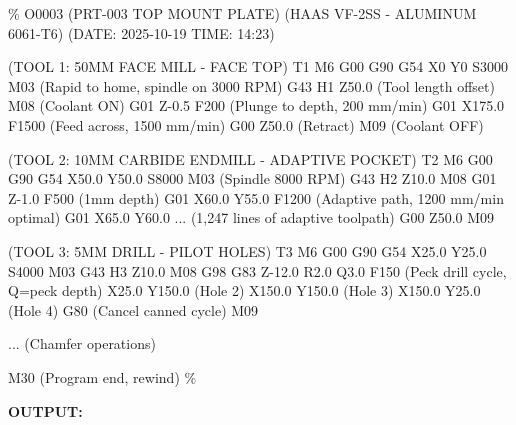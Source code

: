 \documentclass[
]{article}
\newenvironment{Shaded}{\begin{snugshade}}{\end{snugshade}}
\newcommand{\NormalTok}[1]{#1}
\begin{document}
\begin{Shaded}
\begin{Highlighting}[]
\NormalTok{\%}
\NormalTok{O0003 (PRT{-}003 TOP MOUNT PLATE)}
\NormalTok{(HAAS VF{-}2SS {-} ALUMINUM 6061{-}T6)}
\NormalTok{(DATE: 2025{-}10{-}19  TIME: 14:23)}

\NormalTok{(TOOL 1: 50MM FACE MILL {-} FACE TOP)}
\NormalTok{T1 M6}
\NormalTok{G00 G90 G54 X0 Y0 S3000 M03  (Rapid to home, spindle on 3000 RPM)}
\NormalTok{G43 H1 Z50.0                  (Tool length offset)}
\NormalTok{M08                           (Coolant ON)}
\NormalTok{G01 Z{-}0.5 F200                (Plunge to depth, 200 mm/min)}
\NormalTok{G01 X175.0 F1500              (Feed across, 1500 mm/min)}
\NormalTok{G00 Z50.0                     (Retract)}
\NormalTok{M09                           (Coolant OFF)}

\NormalTok{(TOOL 2: 10MM CARBIDE ENDMILL {-} ADAPTIVE POCKET)}
\NormalTok{T2 M6}
\NormalTok{G00 G90 G54 X50.0 Y50.0 S8000 M03  (Spindle 8000 RPM)}
\NormalTok{G43 H2 Z10.0}
\NormalTok{M08}
\NormalTok{G01 Z{-}1.0 F500                (1mm depth)}
\NormalTok{G01 X60.0 Y55.0 F1200         (Adaptive path, 1200 mm/min optimal)}
\NormalTok{G01 X65.0 Y60.0}
\NormalTok{... (1,247 lines of adaptive toolpath)}
\NormalTok{G00 Z50.0}
\NormalTok{M09}

\NormalTok{(TOOL 3: 5MM DRILL {-} PILOT HOLES)}
\NormalTok{T3 M6}
\NormalTok{G00 G90 G54 X25.0 Y25.0 S4000 M03}
\NormalTok{G43 H3 Z10.0}
\NormalTok{M08}
\NormalTok{G98 G83 Z{-}12.0 R2.0 Q3.0 F150  (Peck drill cycle, Q=peck depth)}
\NormalTok{X25.0 Y150.0                    (Hole 2)}
\NormalTok{X150.0 Y150.0                   (Hole 3)}
\NormalTok{X150.0 Y25.0                    (Hole 4)}
\NormalTok{G80                             (Cancel canned cycle)}
\NormalTok{M09}

\NormalTok{... (Chamfer operations)}

\NormalTok{M30                             (Program end, rewind)}
\NormalTok{\%}
\end{Highlighting}
\end{Shaded}

\textbf{OUTPUT:}
\end{document}
